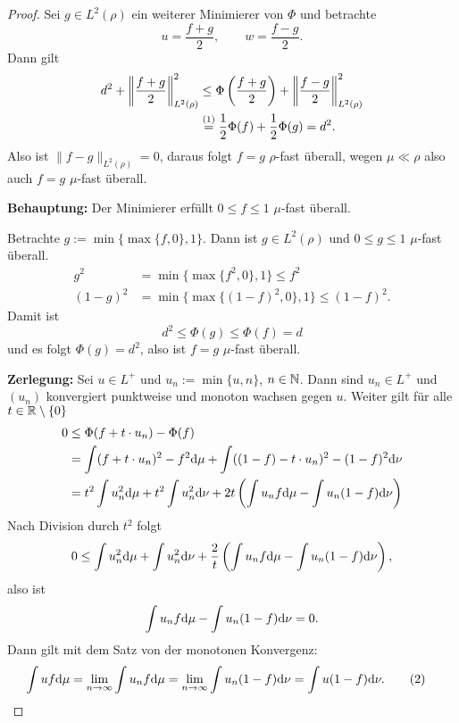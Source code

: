 \documentclass[
 a4paper,
 12pt,
 parskip=half
 ]{scrreprt}
\theoremstyle{plain}
\theoremstyle{definition}
\numberwithin{equation}{section}
\begin{document}
\begin{proof}
  Sei $g \in L^2(\rho)$ ein weiterer Minimierer von $\Phi$ und betrachte
  \[ u = \frac{f+g}{2}, \qquad w = \frac{f-g}{2}. \]
  Dann gilt
  \begin{align*}
    d^2 + \left\| \frac{f+g}{2} \right\|^2_{L^2(\rho)}
    &\le \Phi \left( \frac{f+g}{2} \right) + \left\| \frac{f-g}{2} \right\|^2_{L^2(\rho)} \\
    &\overset{(1)}{=} \frac{1}{2} \Phi(f) + \frac{1}{2} \Phi(g) = d^2.
  \end{align*}
  Also ist $\|f-g\|_{L^2(\rho)} = 0$, daraus folgt $f=g$ $\rho$-fast überall,
  wegen $\mu \ll \rho$ also auch $f=g$ $\mu$-fast überall.

  \textbf{Behauptung:} Der Minimierer erfüllt $0 \le f \le 1$ $\mu$-fast überall.

  Betrachte $g := \min \{ \max \{f,0\}, 1\}$. Dann ist $g \in L^2(\rho)$ und $0
  \le g \le 1$ $\mu$-fast überall.
  \begin{align*}
    g^2 &= \min \{ \max \{ f^2, 0 \}, 1 \} \le f^2 \\
    (1-g)^2 &= \min \{ \max \{ (1-f)^2, 0 \}, 1 \} \le (1-f)^2.
  \end{align*}
  Damit ist
  \[ d^2 \le \Phi(g) \le \Phi(f) = d \]
  und es folgt $\Phi(g) = d^2$, also ist $f=g$ $\mu$-fast überall.

  \textbf{Zerlegung:} Sei $u \in L^+$ und $u_n := \min \{u,n\}$, $n \in \mathbb{N}$.
  Dann sind $u_n \in L^+$ und $(u_n)$ konvergiert punktweise und monoton wachsen
  gegen $u$. Weiter gilt für alle $t \in \mathbb{R} \setminus \{0\}$
  \begin{align*}
    0 &\le \Phi(f + t \cdot u_n) - \Phi(f) \\
    &= \int( f + t\cdot u_n)^2 - f^2 \mathrm{d} \mu + \int((1-f)-t \cdot u_n)^2 - (1-f)^2 \mathrm{d} \nu \\
    &= t^2 \int u_n^2 \mathrm{d} \mu + t^2 \int u_n^2 \mathrm{d} \nu
      + 2 t \left( \int u_n f \mathrm{d} \mu - \int u_n (1-f) \mathrm{d} \nu \right)
  \end{align*}
  Nach Division durch $t^2$ folgt
  \[ 0 \le \int u_n^2 \mathrm{d} \mu + \int u_n^2 \mathrm{d} \nu
      + \frac{2}{t} \left( \int u_n f \mathrm{d} \mu - \int u_n (1-f) \mathrm{d} \nu
      \right), \]
  also ist 
  \[ \int u_n f \mathrm{d} \mu - \int u_n (1-f) \mathrm{d} \nu = 0. \]
  Dann gilt mit dem Satz von der monotonen Konvergenz:
  \begin{align*}
    \int u f \mathrm{d} \mu
    &= \lim_{n \to \infty} \int u_n f \mathrm{d} \mu = \lim_{n \to \infty} \int u_n (1-f) \mathrm{d} \nu
      = \int u (1-f) \mathrm{d} \nu. \tag{2}
  \end{align*}


\end{proof}
\end{document}

